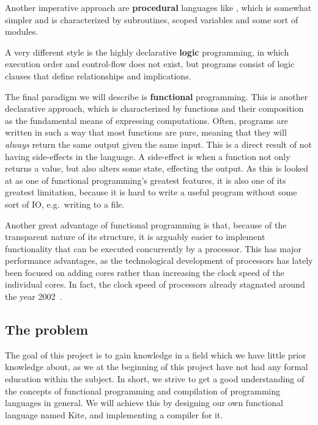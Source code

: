 Another imperative approach are \textbf{procedural} languages like , which is somewhat simpler and is characterized by subroutines, scoped variables and some sort of modules.

A very different style is the highly declarative \textbf{logic} programming, in which execution order and control-flow does not exist, but programs consist of logic clauses that define relationships and implications.

The final paradigm we will describe is \textbf{functional} programming. This is another declarative approach, which is characterized by functions and their composition as the fundamental means of expressing computations. Often, programs are written in such a way that most functions are pure, meaning that they will \emph{always} return the same output given the same input. This is a direct result of not having side-effects in the language. A side-effect is when a function not only returns a value, but also alters some state, effecting the output. As this is looked at as one of functional programming's greatest features, it is also one of its greatest limitation, because it is hard to write a useful program without some sort of IO, e.g.\ writing to a file.

Another great advantage of functional programming is that, because of the transparent nature of its structure, it is arguably easier to implement functionality that can be executed concurrently by a processor. This has major performance advantages, as the technological development of processors has lately been focused on adding cores rather than increasing the clock speed of the individual cores. In fact, the clock speed of processors already stagnated around the year 2002~\cite{sutter09}.


\subsection{The problem}
The goal of this project is to gain knowledge in a field which we have little prior knowledge about, as we at the beginning of this project have not had any formal education within the subject. In short, we strive to get a good understanding of the concepts of functional programming and compilation of programming languages in general. We will achieve this by designing our own functional language named Kite, and implementing a compiler for it.


